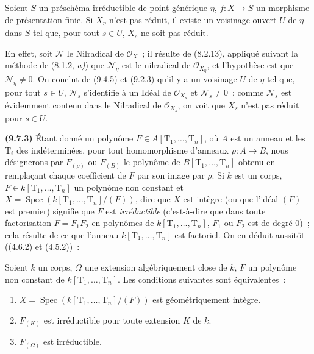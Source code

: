 
\begin{lemma}[9.7.2]
\label{IV.9.7.2-fr}
Soient $S$ un préschéma irréductible de point générique $\eta$, $f:X\to S$
un morphisme de présentation finie. Si $X_\eta$ n'est pas réduit, il existe un
voisinage ouvert $U$ de $\eta$ dans $S$ tel que, pour tout $s\in U$, $X_s$ ne
soit pas réduit.
\end{lemma}

En effet, soit $\mathcal N$ le Nilradical de $\mathcal O_X$~; il résulte de
(8.2.13), appliqué suivant la méthode de (8.1.2, \emph{a)}) que $\mathcal N_\eta$
est le nilradical de $\mathcal O_{X_\eta}$, et l'hypothèse est que
$\mathcal N_\eta\neq0$. On conclut de (9.4.5) et (9.2.3) qu'il y a un voisinage
$U$ de $\eta$ tel que, pour tout $s\in U$, $\mathcal N_s$ s'identifie à un Idéal
de $\mathcal O_{X_s}$ et $\mathcal N_s\neq0$~; comme $\mathcal N_s$ est
évidemment contenu dans le Nilradical de $\mathcal O_{X_s}$, on voit que $X_s$
n'est pas réduit pour $s\in U$.

\label{IV.9.7.3-fr}%
\textbf{(9.7.3)} Étant donné un polynôme
$F\in A[\mathrm T_1,\ldots,\mathrm T_n]$, où $A$ est un anneau et les
$\mathrm T_i$ des indéterminées, pour tout homomorphisme d'anneaux
$\rho:A\to B$, nous désignerons par $F_{(\rho)}$ ou $F_{(B)}$ le polynôme de
$B[\mathrm T_1,\ldots,\mathrm T_n]$ obtenu en remplaçant chaque coefficient de
$F$ par son image par $\rho$. Si $k$ est un corps,
$F\in k[\mathrm T_1,\ldots,\mathrm T_n]$ un polynôme non constant et
$X=\operatorname{Spec}(k[\mathrm T_1,\ldots,\mathrm T_n]/(F))$, dire que $X$
est intègre (ou que l'idéal $(F)$ est premier) signifie que $F$ est
\emph{irréductible} (c'est-à-dire que dans toute factorisation $F=F_1F_2$ en
polynômes de $k[\mathrm T_1,\ldots,\mathrm T_n]$, $F_1$ ou $F_2$ est de degré
$0$)~; cela résulte de ce que l'anneau $k[\mathrm T_1,\ldots,\mathrm T_n]$ est
factoriel. On en déduit aussitôt ((4.6.2) et (4.5.2))~:

\begin{lemma}[9.7.4]
\label{IV.9.7.4-fr}
Soient $k$ un corps, $\Omega$ une extension algébriquement close de $k$, $F$ un
polynôme non constant de $k[\mathrm T_1,\ldots,\mathrm T_n]$. Les conditions
suivantes sont équivalentes~:
\begin{enumerate}[label=\alph*)]
  \item $X=\operatorname{Spec}(k[\mathrm T_1,\ldots,\mathrm T_n]/(F))$ est
  géométriquement intègre.
  \item $F_{(K)}$ est irréductible pour toute extension $K$ de $k$.
  \item $F_{(\Omega)}$ est irréductible.
\end{enumerate}
\end{lemma}

